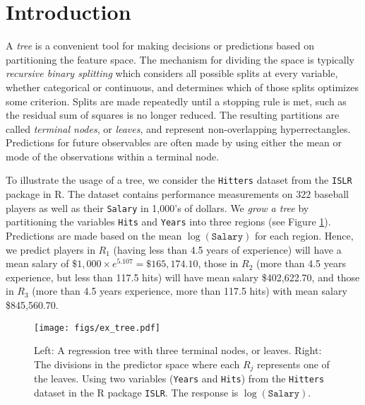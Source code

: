 \section{Introduction} %

A \emph{tree} is a convenient tool for making decisions or predictions based on partitioning the feature space. The mechanism for dividing the space is typically \emph{recursive binary splitting} which considers all possible splits at every variable, whether categorical or continuous, and determines which of those splits optimizes some criterion. Splits are made repeatedly until a stopping rule is met, such as the residual sum of squares is no longer reduced. The resulting partitions are called \emph{terminal nodes}, or \emph{leaves}, and represent non-overlapping hyperrectangles. Predictions for future observables are often made by using either the mean or mode of the observations within a terminal node.

To illustrate the usage of a tree, we consider the \texttt{Hitters} dataset from the \texttt{ISLR} package in R. The dataset contains performance measurements on $322$ baseball players as well as their \texttt{Salary} in 1,000's of dollars. We \emph{grow a tree} by partitioning the variables \texttt{Hits} and \texttt{Years} into three regions (see Figure \ref{tree1}). Predictions are made based on the mean $\log(\mathtt{Salary})$ for each region. Hence, we predict players in $R_1$ (having less than 4.5 years of experience) will have a mean salary of $\$1,000\times e^{5.107}=\$165,174.10$, those in $R_2$ (more than 4.5 years experience, but less than 117.5 hits) will have mean salary \$402,622.70, and those in $R_3$ (more than 4.5 years experience, more than 117.5 hits) with mean salary \$845,560.70. %

\begin{figure}
\begin{center}
\texttt{[image: figs/ex\_tree.pdf]}
\caption{Left: A regression tree with three terminal nodes, or leaves. Right: The divisions in the predictor space where each $R_j$ represents one of the leaves. Using two variables (\texttt{Years} and \texttt{Hits}) from the \texttt{Hitters} dataset in the R package \texttt{ISLR}. The response is $\log(\mathtt{Salary})$.}
\label{tree1}
\end{center}
\end{figure}

